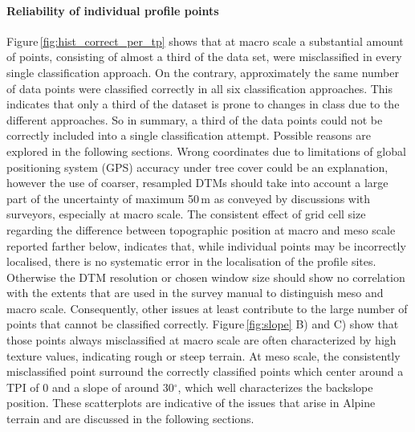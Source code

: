 \documentclass[preprint,12pt,authoryear]{elsarticle}
\begin{document}
\paragraph{Reliability of individual profile points} 
Figure\,\ref{fig:hist_correct_per_tp} shows that at macro scale a substantial amount of points, consisting of almost a third of the data set, were misclassified in every single classification approach. On the contrary, approximately the same number of data points were classified correctly in all six classification approaches. This indicates that only a third of the dataset is prone to changes in class due to the different approaches. So in summary, a third of the data points could not be correctly included into a single classification attempt. Possible reasons are explored in the following sections. Wrong coordinates due to limitations of global positioning system (GPS) accuracy under tree cover could be an explanation, however the use of coarser, resampled DTMs should take into account a large part of the uncertainty of maximum 50\,m as conveyed by discussions with surveyors, especially at macro scale. The consistent effect of grid cell size regarding the difference between topographic position at macro and meso scale reported farther below, indicates that, while individual points may be incorrectly localised, there is no systematic error in the localisation of the profile sites. Otherwise the DTM resolution or chosen window size should show no correlation with the extents that are used in the survey manual to distinguish meso and macro scale. Consequently, other issues at least contribute to the large number of points that cannot be classified correctly. Figure\,\ref{fig:slope} B) and C) show that those points always misclassified at macro scale are often characterized by high texture values, indicating rough or steep terrain. At meso scale, the consistently misclassified point surround the correctly classified points which center around a TPI of 0 and a slope of around 30$^{\circ}$, which well characterizes the backslope position. These scatterplots are indicative of the issues that arise in Alpine terrain and are discussed in the following sections.
\end{document}
